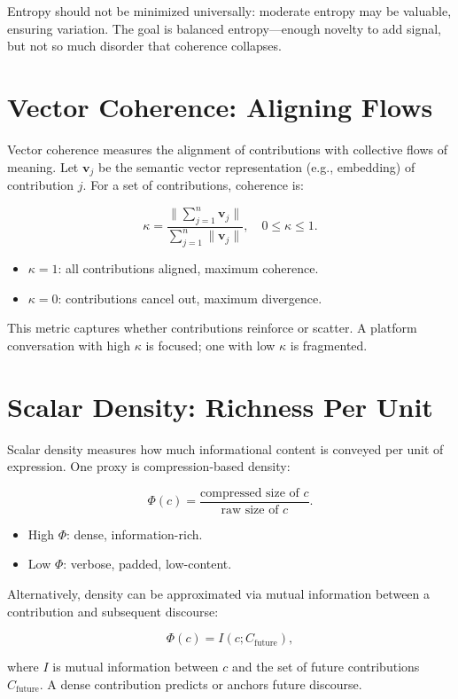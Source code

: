 \documentclass[openany]{book}
\begin{document}
Entropy should not be minimized universally: moderate entropy may be valuable, ensuring variation. The goal is balanced entropy---enough novelty to add signal, but not so much disorder that coherence collapses.

\section{Vector Coherence: Aligning Flows}

Vector coherence measures the alignment of contributions with collective flows of meaning. Let $\mathbf{v}_j$ be the semantic vector representation (e.g., embedding) of contribution $j$. For a set of contributions, coherence is:

\[ \kappa = \frac{\|\sum_{j=1}^n \mathbf{v}_j\|}{\sum_{j=1}^n \|\mathbf{v}_j\|}, \quad 0 \leq \kappa \leq 1. \]

\begin{itemize}
    \item $\kappa = 1$: all contributions aligned, maximum coherence.
    \item $\kappa = 0$: contributions cancel out, maximum divergence.
\end{itemize}

This metric captures whether contributions reinforce or scatter. A platform conversation with high $\kappa$ is focused; one with low $\kappa$ is fragmented.

\section{Scalar Density: Richness Per Unit}

Scalar density measures how much informational content is conveyed per unit of expression. One proxy is compression-based density:

\[ \Phi(c) = \frac{\text{compressed size of } c}{\text{raw size of } c}. \]

\begin{itemize}
    \item High $\Phi$: dense, information-rich.
    \item Low $\Phi$: verbose, padded, low-content.
\end{itemize}

Alternatively, density can be approximated via mutual information between a contribution and subsequent discourse:

\[ \Phi(c) = I(c; C_{\text{future}}), \]

where $I$ is mutual information between $c$ and the set of future contributions $C_{\text{future}}$. A dense contribution predicts or anchors future discourse.
\end{document}
